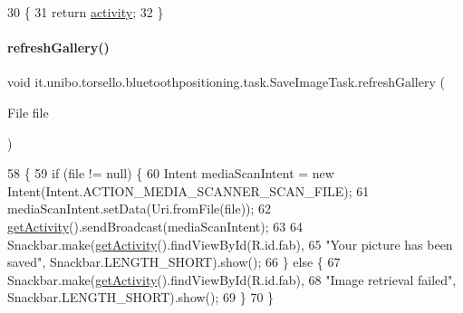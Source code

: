 \begin{DoxyCode}
30                                            \{
31         \textcolor{keywordflow}{return} \hyperlink{classit_1_1unibo_1_1torsello_1_1bluetoothpositioning_1_1task_1_1SaveImageTask_a340aca6a2cdcfbf41aed236588669203_a340aca6a2cdcfbf41aed236588669203}{activity};
32     \}
\end{DoxyCode}
\hypertarget{classit_1_1unibo_1_1torsello_1_1bluetoothpositioning_1_1task_1_1SaveImageTask_a813b3e0d75f59558de551aa6251e3d08_a813b3e0d75f59558de551aa6251e3d08}{}\label{classit_1_1unibo_1_1torsello_1_1bluetoothpositioning_1_1task_1_1SaveImageTask_a813b3e0d75f59558de551aa6251e3d08_a813b3e0d75f59558de551aa6251e3d08} 
\paragraph{\texorpdfstring{refresh\+Gallery()}{refreshGallery()}}
{\footnotesize\ttfamily void it.\+unibo.\+torsello.\+bluetoothpositioning.\+task.\+Save\+Image\+Task.\+refresh\+Gallery (\begin{DoxyParamCaption}\item[{File}]{file }\end{DoxyParamCaption})\hspace{0.3cm}{\ttfamily [private]}}


\begin{DoxyCode}
58                                            \{
59         \textcolor{keywordflow}{if} (file != null) \{
60             Intent mediaScanIntent = \textcolor{keyword}{new} Intent(Intent.ACTION\_MEDIA\_SCANNER\_SCAN\_FILE);
61             mediaScanIntent.setData(Uri.fromFile(file));
62             \hyperlink{classit_1_1unibo_1_1torsello_1_1bluetoothpositioning_1_1task_1_1SaveImageTask_a6fda270f42937b64e3767644e7dd63a5_a6fda270f42937b64e3767644e7dd63a5}{getActivity}().sendBroadcast(mediaScanIntent);
63 
64             Snackbar.make(\hyperlink{classit_1_1unibo_1_1torsello_1_1bluetoothpositioning_1_1task_1_1SaveImageTask_a6fda270f42937b64e3767644e7dd63a5_a6fda270f42937b64e3767644e7dd63a5}{getActivity}().findViewById(R.id.fab),
65                     \textcolor{stringliteral}{"Your picture has been saved"}, Snackbar.LENGTH\_SHORT).show();
66         \} \textcolor{keywordflow}{else} \{
67             Snackbar.make(\hyperlink{classit_1_1unibo_1_1torsello_1_1bluetoothpositioning_1_1task_1_1SaveImageTask_a6fda270f42937b64e3767644e7dd63a5_a6fda270f42937b64e3767644e7dd63a5}{getActivity}().findViewById(R.id.fab),
68                     \textcolor{stringliteral}{"Image retrieval failed"}, Snackbar.LENGTH\_SHORT).show();
69         \}
70     \}
\end{DoxyCode}


